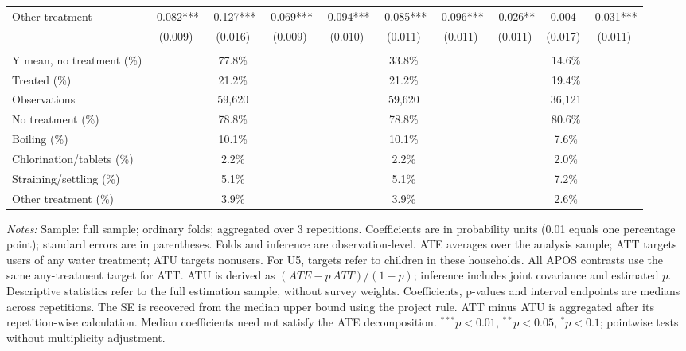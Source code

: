 \documentclass[10pt]{article}
\begin{document}
\begin{table}[H]
\begin{adjustbox}{max width=\linewidth}
\begin{tabular}{lccccccccc}
Other treatment & -0.082*** & -0.127*** & -0.069*** & -0.094*** & -0.085*** & -0.096*** & -0.026** & 0.004 & -0.031*** \\
 & (0.009) & (0.016) & (0.009) & (0.010) & (0.011) & (0.011) & (0.011) & (0.017) & (0.011) \\
\addlinespace[6pt]
\multicolumn{10}{l}{\textit{Descriptive statistics and sample}} \\
Y mean, no treatment (\%) & \multicolumn{3}{c}{77.8\%} & \multicolumn{3}{c}{33.8\%} & \multicolumn{3}{c}{14.6\%} \\
Treated (\%) & \multicolumn{3}{c}{21.2\%} & \multicolumn{3}{c}{21.2\%} & \multicolumn{3}{c}{19.4\%} \\
Observations & \multicolumn{3}{c}{59,620} & \multicolumn{3}{c}{59,620} & \multicolumn{3}{c}{36,121} \\
No treatment (\%) & \multicolumn{3}{c}{78.8\%} & \multicolumn{3}{c}{78.8\%} & \multicolumn{3}{c}{80.6\%} \\
Boiling (\%) & \multicolumn{3}{c}{10.1\%} & \multicolumn{3}{c}{10.1\%} & \multicolumn{3}{c}{7.6\%} \\
Chlorination/tablets (\%) & \multicolumn{3}{c}{2.2\%} & \multicolumn{3}{c}{2.2\%} & \multicolumn{3}{c}{2.0\%} \\
Straining/settling (\%) & \multicolumn{3}{c}{5.1\%} & \multicolumn{3}{c}{5.1\%} & \multicolumn{3}{c}{7.2\%} \\
Other treatment (\%) & \multicolumn{3}{c}{3.9\%} & \multicolumn{3}{c}{3.9\%} & \multicolumn{3}{c}{2.6\%} \\
\hline\hline
\end{tabular}
\end{adjustbox}
\par\vspace{3pt}
\begin{minipage}{\linewidth}\scriptsize \textit{Notes:} Sample: full sample; ordinary folds; aggregated over 3 repetitions. Coefficients are in probability units (0.01 equals one percentage point); standard errors are in parentheses. Folds and inference are observation-level. ATE averages over the analysis sample; ATT targets users of any water treatment; ATU targets nonusers. For U5, targets refer to children in these households. All APOS contrasts use the same any-treatment target for ATT. ATU is derived as $(ATE-p\,ATT)/(1-p)$; inference includes joint covariance and estimated $p$. Descriptive statistics refer to the full estimation sample, without survey weights. Coefficients, p-values and interval endpoints are medians across repetitions. The SE is recovered from the median upper bound using the project rule. ATT minus ATU is aggregated after its repetition-wise calculation. Median coefficients need not satisfy the ATE decomposition. $^{***}p<0.01$, $^{**}p<0.05$, $^{*}p<0.1$; pointwise tests without multiplicity adjustment.\end{minipage}
\end{table}
\end{document}
